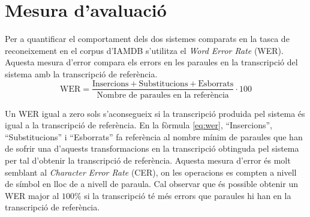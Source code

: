 \section{Mesura d'avaluació}
Per a quantificar el comportament dels dos sistemes comparats en la tasca de reconeixement en el corpus d'IAMDB s'utilitza el \emph{Word Error Rate} (WER). Aquesta mesura d'error compara els errors en les paraules en la transcripció del sistema amb la transcripció de referència.
\begin{equation}\label{eq:wer}
\text{WER} =  \frac{\text{Insercions} + \text{Substitucions} + \text{Esborrats}}{\text{Nombre de paraules en la referència}} \cdot 100
\end{equation}

Un WER igual a zero sols s'aconsegueix si la transcripció produida pel sistema és igual a la transcripció de referència. En la fòrmula \ref{eq:wer}, ``Insercions'', ``Substitucions'' i ``Esborrats'' fa referència al nombre mínim de paraules que han de sofrir una d'aquests transformacions en la transcripció obtinguda pel sistema per tal d'obtenir la transcripció de referència. Aquesta mesura d'error és molt semblant al \emph{Character Error Rate} (CER), on les operacions es compten a nivell de símbol en lloc de a nivell de paraula. Cal observar que és possible obtenir un WER major al $100\%$ si la transcripció té més errors que paraules hi han en la transcripció de referència.

